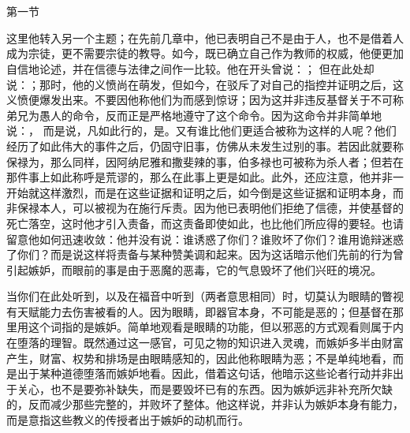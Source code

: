 

\section{}

 第一节\par

\par

这里他转入另一个主题；在先前几章中，他已表明自己不是由于人，也不是借着人成为宗徒，更不需要宗徒的教导。如今，既已确立自己作为教师的权威，他便更加自信地论述，并在信德与法律之间作一比较。他在开头曾说：； 但在此处却说：；那时，他的义愤尚在萌发，但如今，在驳斥了对自己的指控并证明之后，这义愤便爆发出来。不要因他称他们为而感到惊讶；因为这并非违反基督关于不可称弟兄为愚人的命令，反而正是严格地遵守了这个命令。因为这命令并非简单地说：， 而是说，凡如此行的，是。又有谁比他们更适合被称为这样的人呢？他们经历了如此伟大的事件之后，仍固守旧事，仿佛从未发生过别的事。若因此就要称保禄为，那么同样，因阿纳尼雅和撒斐辣的事，伯多禄也可被称为杀人者；但若在那件事上如此称呼是荒谬的，那么在此事上更是如此。此外，还应注意，他并非一开始就这样激烈，而是在这些证据和证明之后，如今倒是这些证据和证明本身，而非保禄本人，可以被视为在施行斥责。因为他已表明他们拒绝了信德，并使基督的死亡落空，这时他才引入责备，而这责备即使如此，也比他们所应得的要轻。也请留意他如何迅速收敛：他并没有说：谁诱惑了你们？谁败坏了你们？谁用诡辩迷惑了你们？而是说这样将责备与某种赞美调和起来。因为这话暗示他们先前的行为曾引起嫉妒，而眼前的事是由于恶魔的恶毒，它的气息毁坏了他们兴旺的境况。\par

当你们在此处听到，以及在福音中听到（两者意思相同）时，切莫认为眼睛的瞥视有天赋能力去伤害被看的人。因为眼睛，即器官本身，不可能是恶的；但基督在那里用这个词指的是嫉妒。简单地观看是眼睛的功能，但以邪恶的方式观看则属于内在堕落的理智。既然通过这一感官，可见之物的知识进入灵魂，而嫉妒多半由财富产生，财富、权势和排场是由眼睛感知的，因此他称眼睛为恶；不是单纯地看，而是出于某种道德堕落而嫉妒地看。因此，借着这句话，他暗示这些论者行动并非出于关心，也不是要弥补缺失，而是要毁坏已有的东西。因为嫉妒远非补充所欠缺的，反而减少那些完整的，并败坏了整体。他这样说，并非认为嫉妒本身有能力，而是意指这些教义的传授者出于嫉妒的动机而行。\par

